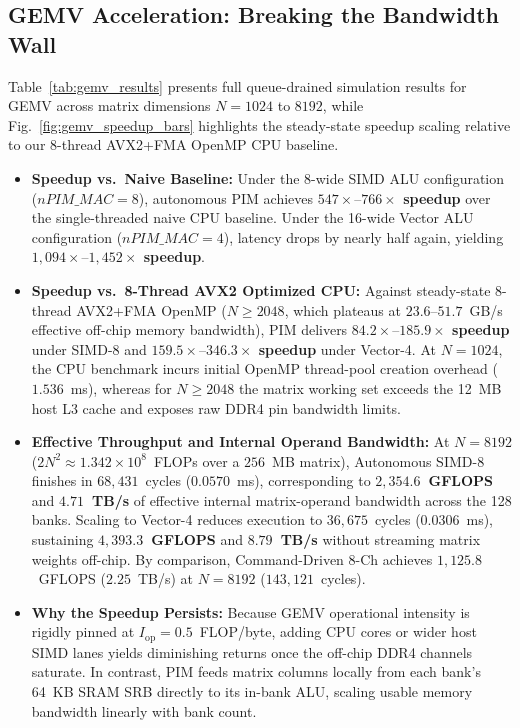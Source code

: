 \documentclass[conference]{IEEEtran}
\begin{document}
\subsection{GEMV Acceleration: Breaking the Bandwidth Wall}
Table~\ref{tab:gemv_results} presents full queue-drained simulation results for GEMV across matrix dimensions $N = 1024$ to $8192$, while Fig.~\ref{fig:gemv_speedup_bars} highlights the steady-state speedup scaling relative to our 8-thread AVX2+FMA OpenMP CPU baseline.
\begin{itemize}
    \item \textbf{Speedup vs.\ Naive Baseline:} Under the 8-wide SIMD ALU configuration ($nPIM\_MAC = 8$), autonomous PIM achieves \textbf{$547\times\text{--}766\times$ speedup} over the single-threaded naive CPU baseline. Under the 16-wide Vector ALU configuration ($nPIM\_MAC = 4$), latency drops by nearly half again, yielding \textbf{$1,094\times\text{--}1,452\times$ speedup}.
    \item \textbf{Speedup vs.\ 8-Thread AVX2 Optimized CPU:} Against steady-state 8-thread AVX2+FMA OpenMP ($N \ge 2048$, which plateaus at $23.6\text{--}51.7$~GB/s effective off-chip memory bandwidth), PIM delivers \textbf{$84.2\times\text{--}185.9\times$ speedup} under SIMD-8 and \textbf{$159.5\times\text{--}346.3\times$ speedup} under Vector-4. At $N=1024$, the CPU benchmark incurs initial OpenMP thread-pool creation overhead ($1.536$~ms), whereas for $N \ge 2048$ the matrix working set exceeds the 12~MB host L3 cache and exposes raw DDR4 pin bandwidth limits.
    \item \textbf{Effective Throughput and Internal Operand Bandwidth:} At $N = 8192$ ($2N^2 \approx 1.342 \times 10^8$~FLOPs over a $256$~MB matrix), Autonomous SIMD-8 finishes in $68,431$~cycles ($0.0570$~ms), corresponding to \textbf{$2,354.6$~GFLOPS} and \textbf{$4.71$~TB/s} of effective internal matrix-operand bandwidth across the 128 banks. Scaling to Vector-4 reduces execution to $36,675$~cycles ($0.0306$~ms), sustaining \textbf{$4,393.3$~GFLOPS} and \textbf{$8.79$~TB/s} without streaming matrix weights off-chip. By comparison, Command-Driven 8-Ch achieves $1,125.8$~GFLOPS ($2.25$~TB/s) at $N=8192$ ($143,121$~cycles).
    \item \textbf{Why the Speedup Persists:} Because GEMV operational intensity is rigidly pinned at $I_{\text{op}} = 0.5$~FLOP/byte, adding CPU cores or wider host SIMD lanes yields diminishing returns once the off-chip DDR4 channels saturate. In contrast, PIM feeds matrix columns locally from each bank's 64~KB SRAM SRB directly to its in-bank ALU, scaling usable memory bandwidth linearly with bank count.

\end{itemize}
\end{document}
